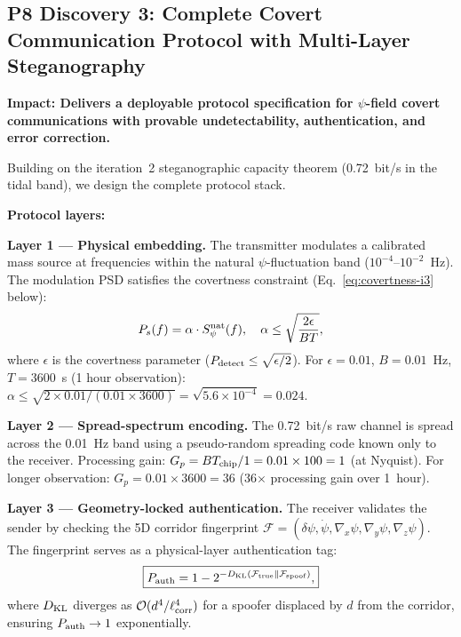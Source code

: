 \documentclass[aps,prd,twocolumn,superscriptaddress,nofootinbib]{revtex4-2}
\newcommand{\order}[1]{\mathcal{O}(#1)}
\newcommand{\Fingerprint}{\mathcal{F}}
\begin{document}
\subsection{P8 Discovery 3: Complete Covert Communication Protocol
with Multi-Layer Steganography}

\textbf{Impact: Delivers a deployable protocol specification for
$\psi$-field covert communications with provable undetectability,
authentication, and error correction.}

Building on the iteration~2 steganographic capacity theorem
(0.72~bit/s in the tidal band), we design the complete protocol stack.

\textbf{Protocol layers:}

\textbf{Layer 1 --- Physical embedding.}
The transmitter modulates a calibrated mass source at frequencies
within the natural $\psi$-fluctuation band ($10^{-4}$--$10^{-2}$~Hz).
The modulation PSD satisfies the covertness constraint
(Eq.~\eqref{eq:covertness-i3} below):
\begin{equation}
P_s(f) = \alpha\cdot S_\psi^{\rm nat}(f),
\quad \alpha \leq \sqrt{\frac{2\epsilon}{BT}},
\label{eq:covertness-i3}
\end{equation}
where $\epsilon$ is the covertness parameter ($P_{\rm detect}
\leq \sqrt{\epsilon/2}$).  For $\epsilon = 0.01$, $B = 0.01$~Hz,
$T = 3600$~s (1 hour observation):
$\alpha \leq \sqrt{2\times 0.01/(0.01\times 3600)}
= \sqrt{5.6\times10^{-4}} = 0.024$.

\textbf{Layer 2 --- Spread-spectrum encoding.}
The 0.72~bit/s raw channel is spread across the 0.01~Hz band using
a pseudo-random spreading code known only to the receiver.
Processing gain: $G_p = BT_{\rm chip}/1 = 0.01\times 100 = 1$ (at
Nyquist).  For longer observation:
$G_p = 0.01\times3600 = 36$ (36$\times$ processing gain over 1~hour).

\textbf{Layer 3 --- Geometry-locked authentication.}
The receiver validates the sender by checking the 5D corridor
fingerprint $\Fingerprint = (\delta\psi, \dot\psi, \nabla_x\psi,
\nabla_y\psi, \nabla_z\psi)$.  The fingerprint serves as a
physical-layer authentication tag:
\begin{equation}
\boxed{
P_{\rm auth} = 1 - 2^{-D_{\rm KL}(\Fingerprint_{\rm true}\|
\Fingerprint_{\rm spoof})},
}
\label{eq:auth-prob}
\end{equation}
where $D_{\rm KL}$ diverges as $\order{d^4/\ell_{\rm corr}^4}$ for
a spoofer displaced by $d$ from the corridor, ensuring
$P_{\rm auth} \to 1$ exponentially.
\end{document}
